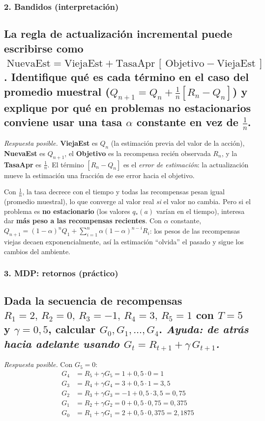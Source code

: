 \documentclass[11pt, a4paper]{article}
\newcommand{\pregunta}[1]{\subsection{#1}}
\newcommand{\eje}[1]{\subsubsection{#1}}
\begin{document}
\eje{2. Bandidos (interpretaci\'on)}
\pregunta{La regla de actualizaci\'on incremental puede escribirse como
$\;\text{NuevaEst} = \text{ViejaEst} + \text{TasaApr}\,[\,\text{Objetivo} - \text{ViejaEst}\,]$.
Identifique qu\'e es cada t\'ermino en el caso del promedio muestral ($Q_{n+1}=Q_n+\frac{1}{n}[R_n-Q_n]$) y explique por qu\'e en problemas \textbf{no estacionarios} conviene usar una tasa $\alpha$ constante en vez de $\frac1n$.}

\begin{respuesta}
\textit{Respuesta posible.} \textbf{ViejaEst} es $Q_n$ (la estimaci\'on previa del valor de la acci\'on), \textbf{NuevaEst} es $Q_{n+1}$, el \textbf{Objetivo} es la recompensa reci\'en observada $R_n$, y la \textbf{TasaApr} es $\frac1n$. El t\'ermino $[R_n - Q_n]$ es el \emph{error de estimaci\'on}: la actualizaci\'on mueve la estimaci\'on una fracci\'on de ese error hacia el objetivo.

Con $\frac1n$, la tasa decrece con el tiempo y todas las recompensas pesan igual (promedio muestral), lo que converge al valor real \emph{si} el valor no cambia. Pero si el problema es \textbf{no estacionario} (los valores $q_*(a)$ var\'ian en el tiempo), interesa dar \textbf{m\'as peso a las recompensas recientes}. Con $\alpha$ constante, $Q_{n+1}=(1-\alpha)^n Q_1 + \sum_{i=1}^{n}\alpha(1-\alpha)^{n-i}R_i$: los pesos de las recompensas viejas decaen exponencialmente, as\'i la estimaci\'on ``olvida'' el pasado y sigue los cambios del ambiente.
\end{respuesta}

\eje{3. MDP: retornos (pr\'actico)}
\pregunta{Dada la secuencia de recompensas $R_1{=}2,\,R_2{=}0,\,R_3{=}{-}1,\,R_4{=}3,\,R_5{=}1$ con $T=5$ y $\gamma=0{,}5$, calcular $G_0, G_1, \dots, G_4$. \emph{Ayuda: de atr\'as hacia adelante usando $G_t = R_{t+1} + \gamma\,G_{t+1}$.}}

\begin{respuesta}
\textit{Respuesta posible.} Con $G_5 = 0$:
\begin{align*}
G_4 &= R_5 + \gamma G_5 = 1 + 0{,}5\cdot 0 = 1 \\
G_3 &= R_4 + \gamma G_4 = 3 + 0{,}5\cdot 1 = 3{,}5 \\
G_2 &= R_3 + \gamma G_3 = -1 + 0{,}5\cdot 3{,}5 = 0{,}75 \\
G_1 &= R_2 + \gamma G_2 = 0 + 0{,}5\cdot 0{,}75 = 0{,}375 \\
G_0 &= R_1 + \gamma G_1 = 2 + 0{,}5\cdot 0{,}375 = 2{,}1875
\end{align*}
\end{respuesta}
\end{document}
